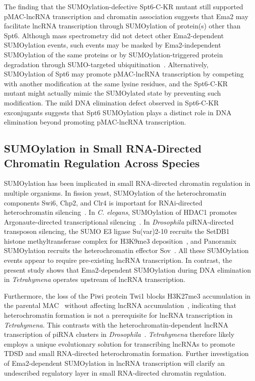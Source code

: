 \documentclass[12pt]{article}
\begin{document}
The finding that the SUMOylation-defective Spt6-C-KR mutant still supported pMAC-lncRNA transcription and chromatin association suggests that Ema2 may facilitate lncRNA transcription through SUMOylation of protein(s) other than Spt6.
Although mass spectrometry did not detect other Ema2-dependent SUMOylation events, such events may be masked by Ema2-independent SUMOylation of the same proteins or by SUMOylation-triggered protein degradation through SUMO-targeted ubiquitination~\citep{Praefcke2012, Staudinger2017}.
Alternatively, SUMOylation of Spt6 may promote pMAC-lncRNA transcription by competing with another modification at the same lysine residues, and the Spt6-C-KR mutant might actually mimic the SUMOylated state by preventing such modification.
The mild DNA elimination defect observed in Spt6-C-KR exconjugants suggests that Spt6 SUMOylation plays a distinct role in DNA elimination beyond promoting pMAC-lncRNA transcription.

\subsection{SUMOylation in Small RNA-Directed Chromatin Regulation Across Species}

SUMOylation has been implicated in small RNA-directed chromatin regulation in multiple organisms.
In fission yeast, SUMOylation of the heterochromatin components Swi6, Chp2, and Clr4 is important for RNAi-directed heterochromatin silencing~\citep{Shin2005}.
In \textit{C. elegans}, SUMOylation of HDAC1 promotes Argonaute-directed transcriptional silencing~\citep{Kim2021}.
In \textit{Drosophila} piRNA-directed transposon silencing, the SUMO E3 ligase Su(var)2-10 recruits the SetDB1 histone methyltransferase complex for H3K9me3 deposition~\citep{Ninova2020a, Ninova2020b}, and Panoramix SUMOylation recruits the heterochromatin effector Sov~\citep{Andreev2022}.
All these SUMOylation events appear to require pre-existing lncRNA transcription.
In contrast, the present study shows that Ema2-dependent SUMOylation during DNA elimination in \textit{Tetrahymena} operates upstream of lncRNA transcription.

Furthermore, the loss of the Piwi protein Twi1 blocks H3K27me3 accumulation in the parental MAC~\citep{Liu2007, Xu2021} without affecting lncRNA accumulation~\citep{Woo2016}, indicating that heterochromatin formation is not a prerequisite for lncRNA transcription in \textit{Tetrahymena}.
This contrasts with the heterochromatin-dependent lncRNA transcription of piRNA clusters in \textit{Drosophila}~\citep{Andersen2017}.
\textit{Tetrahymena} therefore likely employs a unique evolutionary solution for transcribing lncRNAs to promote TDSD and small RNA-directed heterochromatin formation.
Further investigation of Ema2-dependent SUMOylation in lncRNA transcription will clarify an undescribed regulatory layer in small RNA-directed chromatin regulation.
\end{document}

